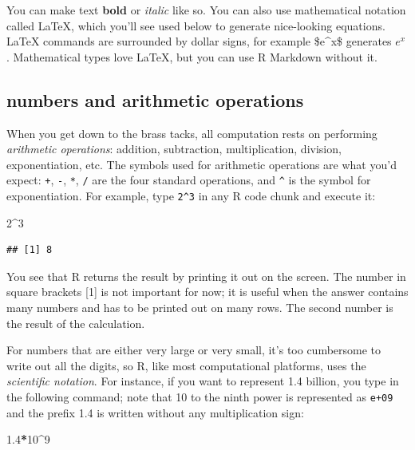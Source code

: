 \documentclass[
]{book}
\newenvironment{Shaded}{\begin{snugshade}}{\end{snugshade}}
\newcommand{\DecValTok}[1]{\textcolor[rgb]{0.00,0.00,0.81}{#1}}
\newcommand{\FloatTok}[1]{\textcolor[rgb]{0.00,0.00,0.81}{#1}}
\newcommand{\OperatorTok}[1]{\textcolor[rgb]{0.81,0.36,0.00}{\textbf{#1}}}
\theoremstyle{definition}
\theoremstyle{definition}
\theoremstyle{definition}
\theoremstyle{remark}
\begin{document}
You can make text \textbf{bold} or \emph{italic} like so. You can also use mathematical notation called LaTeX, which you'll see used below to generate nice-looking equations. LaTeX commands are surrounded by dollar signs, for example \$e\^{}x\$ generates \(e^x\). Mathematical types love LaTeX, but you can use R Markdown without it.

\hypertarget{numbers-and-arithmetic-operations}{%
\subsection{numbers and arithmetic operations}\label{numbers-and-arithmetic-operations}}

When you get down to the brass tacks, all computation rests on performing  \emph{arithmetic operations}: addition, subtraction, multiplication, division, exponentiation, etc. The symbols used for arithmetic operations are what you'd expect: \texttt{+}, \texttt{-}, \texttt{*}, \texttt{/} are the four standard operations, and \texttt{\^{}} is the symbol for exponentiation. For example, type \texttt{2\^{}3} in any R code chunk and execute it:

\begin{Shaded}
\begin{Highlighting}[]
\DecValTok{2}\OperatorTok{\^{}}\DecValTok{3}
\end{Highlighting}
\end{Shaded}

\begin{verbatim}
## [1] 8
\end{verbatim}

You see that R returns the result by printing it out on the screen. The number in square brackets {[}1{]} is not important for now; it is useful when the answer contains many numbers and has to be printed out on many rows. The second number is the result of the calculation.

For numbers that are either very large or very small, it's too cumbersome to write out all the digits, so R, like most computational platforms, uses the \emph{scientific notation}. For instance, if you want to represent 1.4 billion, you type in the following command; note that 10 to the ninth power is represented as \texttt{e+09} and the prefix 1.4 is written without any multiplication sign:

\begin{Shaded}
\begin{Highlighting}[]
\FloatTok{1.4}\OperatorTok{*}\DecValTok{10}\OperatorTok{\^{}}\DecValTok{9}
\end{Highlighting}
\end{Shaded}
\end{document}
